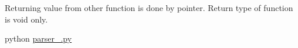 Returning value from other function is done by pointer. Return type of function is void only.

python \hyperlink{parser__1_8py}{parser\+\_.\+py} 